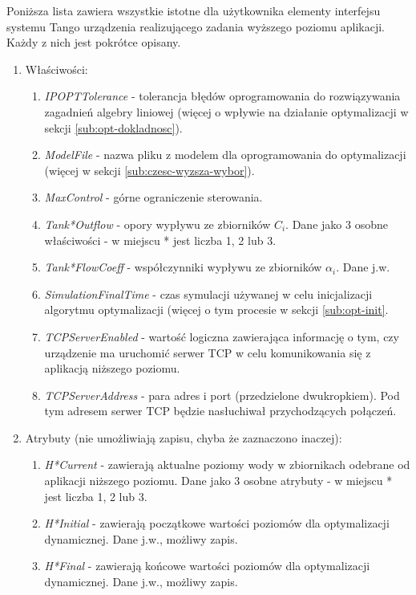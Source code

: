 Poniższa lista zawiera wszystkie istotne dla użytkownika elementy interfejsu systemu Tango urządzenia realizującego zadania wyższego poziomu aplikacji. Każdy z nich jest pokrótce opisany.

\begin{enumerate}
    \item Właściwości:
    \begin{enumerate}
        \item \emph{IPOPTTolerance} - tolerancja błędów oprogramowania do rozwiązywania zagadnień algebry liniowej (więcej o wpływie na działanie optymalizacji w sekcji \ref{sub:opt-dokladnosc}).
        \item \emph{ModelFile} - nazwa pliku z modelem dla oprogramowania do optymalizacji (więcej w sekcji \ref{sub:czesc-wyzsza-wybor}).
        \item \emph{MaxControl} - górne ograniczenie sterowania.
        \item \emph{Tank*Outflow} - opory wypływu ze zbiorników $C_{i}$. Dane jako 3 osobne właściwości - w miejscu * jest liczba 1, 2 lub 3.
        \item \emph{Tank*FlowCoeff} - współczynniki wypływu ze zbiorników $\alpha_{i}$. Dane j.w.
        \item \emph{SimulationFinalTime} - czas symulacji używanej w celu inicjalizacji algorytmu optymalizacji (więcej o tym procesie w sekcji \ref{sub:opt-init}.
        \item \emph{TCPServerEnabled} - wartość logiczna zawierająca informację o tym, czy urządzenie ma uruchomić serwer TCP w celu komunikowania się z aplikacją niższego poziomu.
        \item \emph{TCPServerAddress} - para adres i port (przedzielone dwukropkiem). Pod tym adresem serwer TCP będzie nasłuchiwał przychodzących połączeń.
    \end{enumerate}
    \item Atrybuty (nie umożliwiają zapisu, chyba że zaznaczono inaczej):
    \begin{enumerate}
        \item \emph{H*Current} - zawierają aktualne poziomy wody w zbiornikach odebrane od aplikacji niższego poziomu. Dane jako 3 osobne atrybuty - w miejscu * jest liczba 1, 2 lub 3.
        \item \emph{H*Initial} - zawierają początkowe wartości poziomów dla optymalizacji dynamicznej. Dane j.w., możliwy zapis.
        \item \emph{H*Final} - zawierają końcowe wartości poziomów dla optymalizacji dynamicznej. Dane j.w., możliwy zapis.

\end{enumerate}
\end{enumerate}
